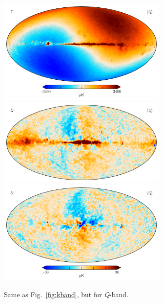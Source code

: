 \documentclass[twocolumn]{../../common/aa}
\newcommand{\Q}[0]{\textit Q}
\begin{document}
\begin{figure}
	\centering
	\includegraphics[width=0.75\textwidth]{figures/Q_mu_I.pdf}
	\includegraphics[width=0.75\textwidth]{figures/Q_mu_Q.pdf}
	\includegraphics[width=0.75\textwidth]{figures/Q_mu_U.pdf}
        \caption{Same as Fig.~\ref{fig:kband}, but for \Q-band.}
	\label{fig:qband}
\end{figure}
\end{document}
